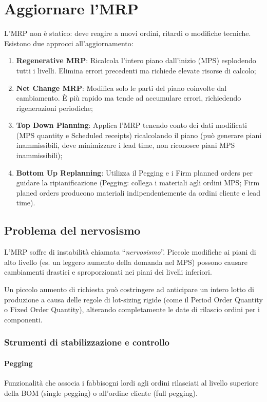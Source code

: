 %
\section{Aggiornare l'MRP}
L'MRP non è statico: deve reagire a nuovi ordini, ritardi o modifiche tecniche. Esistono due approcci all'aggiornamento:
\begin{enumerate}
    \item \textbf{Regenerative MRP}: Ricalcola l'intero piano dall'inizio (MPS) esplodendo tutti i livelli. Elimina errori precedenti ma richiede elevate risorse di calcolo;
    \item \textbf{Net Change MRP}: Modifica solo le parti del piano coinvolte dal cambiamento. È più rapido ma tende ad accumulare errori, richiedendo rigenerazioni periodiche;
    \item \textbf{Top Down Planning}: Applica l'MRP tenendo conto dei dati modificati (MPS quantity e Scheduled receipts) ricalcolando il piano (può generare piani inammissibili, deve minimizzare i lead time, non riconosce piani MPS inammissibili);
    \item \textbf{Bottom Up Replanning}: Utilizza il Pegging e i Firm planned orders per guidare la ripianificazione (Pegging: collega i materiali agli ordini MPS; Firm planed orders producono materiali indipendentemente da ordini cliente e lead time).
\end{enumerate}

%
\subsection{Problema del nervosismo} L'MRP soffre di instabilità chiamata ``\emph{nervosismo}''. Piccole modifiche ai piani di alto livello (es. un leggero aumento della domanda nel MPS) possono causare cambiamenti drastici e sproporzionati nei piani dei livelli inferiori.
\begin{example}
    Un piccolo aumento di richiesta può costringere ad anticipare un intero lotto di produzione a causa delle regole di lot-sizing rigide (come il Period Order Quantity o Fixed Order Quantity), alterando completamente le date di rilascio ordini per i componenti.
\end{example}

%
\subsubsection{Strumenti di stabilizzazione e controllo}
%
\paragraph{Pegging} Funzionalità che associa i fabbisogni lordi agli ordini rilasciati al livello superiore della BOM (single pegging) o all'ordine cliente (full pegging).
%

